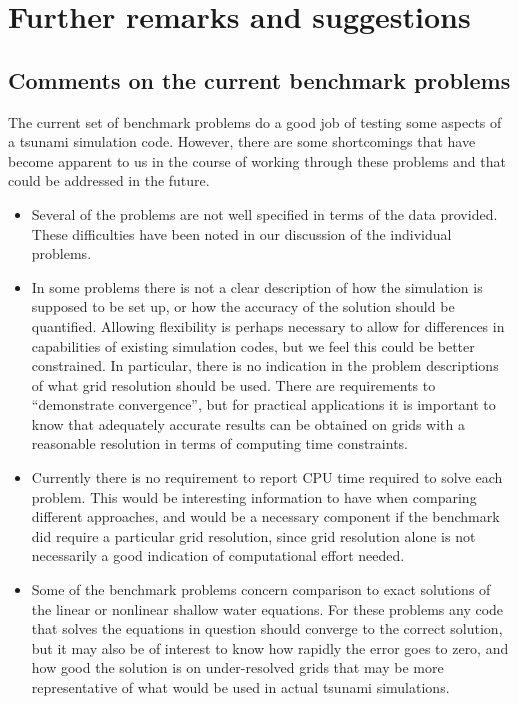 
\section{Further remarks and suggestions}

\subsection{Comments on the current benchmark problems}

The current set of benchmark problems do a good job of testing some aspects
of a tsunami simulation code.  However, there are some shortcomings
that have become apparent to us in the course of working through these
problems and that could be addressed in the future.

\begin{itemize}
\item Several of the problems are not well specified in terms of the data
provided.  These difficulties
have been noted in our discussion of the individual problems.

\item In some problems there is not a clear description of how the
simulation is supposed to be set up, or how the accuracy of the solution
should be quantified.  Allowing flexibility is perhaps necessary to allow
for differences in capabilities of existing simulation codes, but we feel
this could be better constrained.  In particular, there is no indication in
the problem descriptions of what grid resolution should be used.  There are
requirements to ``demonstrate convergence'', but for practical applications
it is important to know that adequately accurate results can be obtained
on grids with a reasonable resolution in terms of computing time
constraints.  

\item Currently 
there is no requirement to report CPU time required to solve each problem. 
This would be interesting information to have when comparing different
approaches, and would be a necessary component if the benchmark did require
a particular grid resolution, since grid resolution alone is not necessarily
a good indication of computational effort needed.

\item Some of the benchmark problems concern comparison to exact solutions
of the linear or nonlinear shallow water equations.  For these problems any
code that solves the equations in question should converge to the correct
solution, but it may also be of interest to know how rapidly the error goes to
zero, and how good the solution is on under-resolved grids that may be more
representative of what would be used in actual tsunami simulations.


\end{itemize}
